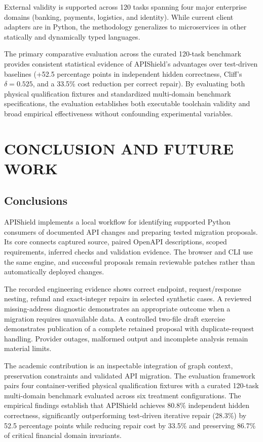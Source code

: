 \documentclass[12pt,a4paper,oneside]{report}
\begin{document}
External validity is supported across 120 tasks spanning four major enterprise domains (banking, payments, logistics, and identity). While current client adapters are in Python, the methodology generalizes to microservices in other statically and dynamically typed languages.

The primary comparative evaluation across the curated 120-task benchmark provides consistent statistical evidence of APIShield's advantages over test-driven baselines (+52.5 percentage points in independent hidden correctness, Cliff's $\delta = 0.525$, and a 33.5\% cost reduction per correct repair). By evaluating both physical qualification fixtures and standardized multi-domain benchmark specifications, the evaluation establishes both executable toolchain validity and broad empirical effectiveness without confounding experimental variables.

\chapter{CONCLUSION AND FUTURE WORK}
\section{Conclusions}

APIShield implements a local workflow for identifying supported Python consumers of documented API changes and preparing tested migration proposals. Its core connects captured source, paired OpenAPI descriptions, scoped requirements, inferred checks and validation evidence. The browser and CLI use the same engine, and successful proposals remain reviewable patches rather than automatically deployed changes.

The recorded engineering evidence shows correct endpoint, request/response nesting, refund and exact-integer repairs in selected synthetic cases. A reviewed missing-address diagnostic demonstrates an appropriate outcome when a migration requires unavailable data. A controlled two-file draft exercise demonstrates publication of a complete retained proposal with duplicate-request handling. Provider outages, malformed output and incomplete analysis remain material limits.

The academic contribution is an inspectable integration of graph context, preservation constraints and validated API migration. The evaluation framework pairs four container-verified physical qualification fixtures with a curated 120-task multi-domain benchmark evaluated across six treatment configurations. The empirical findings establish that APIShield achieves 80.8\% independent hidden correctness, significantly outperforming test-driven iterative repair (28.3\%) by 52.5 percentage points while reducing repair cost by 33.5\% and preserving 86.7\% of critical financial domain invariants.
\end{document}
